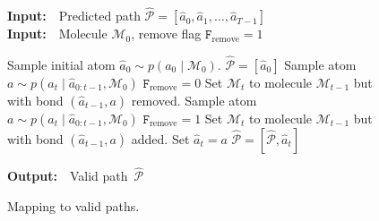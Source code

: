 \documentclass{article}
\newcommand{\Mc}{{\mathcal{M}}}
\newcommand{\Pc}{{\mathcal{P}}}
\newcommand{\ab}{{\mathbf{a}}}
\begin{document}
\begin{figure}
\begin{minipage}{0.5\textwidth}
\begin{algorithm}[H]
  \caption{Mapping to valid paths.}
  {\bf Input:}~~Predicted path $\hat{\Pc} = [\hat{a}_0, \hat{a}_1, \ldots, \hat{a}_{T-1}]$\\
  {\bf Input:}~~Molecule $\Mc_0$, remove flag $\texttt{F}_\textrm{remove} \!=\!1$
  
  \begin{algorithmic}[1]
  	\STATE Sample initial atom $\hat{a}_0 \sim p(a_0 \mid \Mc_0)$.
    \STATE $\hat{\Pc} = [\hat{a}_0]$%
    		\STATE Sample atom $a \sim p(a_t \mid \hat{a}_{0:t-1}, \Mc_0)$%
            	\STATE $\texttt{F}_\textrm{remove} = 0$
            \ENDIF
            \STATE Set $\Mc_t$ to molecule $\Mc_{t-1}$ but with bond $(\hat{a}_{t-1}, a)$ removed.
        \ELSE
        	\STATE Sample atom $a \sim p(a_t \mid \hat{a}_{0:t-1}, \Mc_0)$
            	\STATE $\texttt{F}_\textrm{remove} = 1$
            \ENDIF
            \STATE Set $\Mc_t$ to molecule $\Mc_{t-1}$ but with bond $(\hat{a}_{t-1}, a)$ added.
   		\ENDIF
        \STATE Set $\hat{a}_t = a$
        \STATE $\hat{\Pc} = [\hat{\Pc}, \hat{a}_t]$
    \ENDFOR
  \end{algorithmic}
  {\bf Output:}~~Valid path~$\hat{\Pc}$
  \label{algo:valid_path}
\end{algorithm}
\end{minipage}
\end{figure}


 





\end{document}
